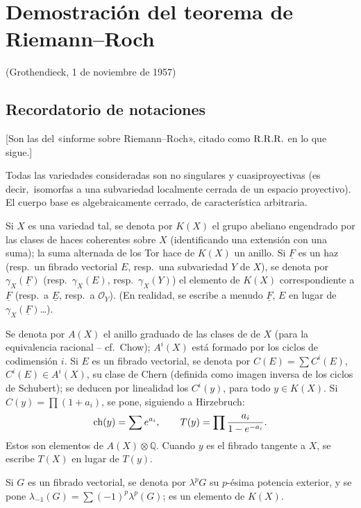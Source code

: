 \section*{Demostración del teorema de Riemann--Roch}
\begin{center}
(Grothendieck, 1 de noviembre de 1957)
\end{center}

\subsection*{Recordatorio de notaciones\footnotemark}
[Son las del «informe sobre Riemann--Roch», citado como \(\mathrm{R.R.R.}\) en lo que sigue.]

Todas las variedades consideradas son no singulares y cuasiproyectivas (es decir,\ isomorfas a una subvariedad localmente cerrada de un espacio proyectivo). El cuerpo base es algebraicamente cerrado, de característica arbitraria.

Si \(X\) es una variedad tal, se denota por \(K(X)\) el grupo abeliano engendrado por las clases de haces coherentes sobre \(X\) (identificando una extensión con una suma); la suma alternada de los Tor hace de \(K(X)\) un anillo. Si \(\underline F\) es un haz (resp.\ un fibrado vectorial \(E\), resp.\ una subvariedad \(Y\) de \(X\)), se denota por \(\gamma_X(\underline F)\) (resp.\ \(\gamma_X(E)\), resp.\ \(\gamma_X(Y)\)) el elemento de \(K(X)\) correspondiente a \(\underline F\) (resp.\ a \(\underline E\), resp.\ a \(\mathcal O_Y\)). (En realidad, se escribe a menudo \(\underline F\), \(E\) en lugar de \(\gamma_X(\underline F)\)\dots).

Se denota por \(A(X)\) el anillo graduado de las clases de  de \(X\) (para la equivalencia racional -- cf.\ Chow); \(A^i(X)\) está formado por los ciclos de codimensión \(i\). Si \(E\) es un fibrado vectorial, se denota por \(C(E)=\sum C^i(E)\), \(C^i(E)\in A^i(X)\), su clase de Chern (definida como imagen inversa de los ciclos de Schubert); se deducen por linealidad los \(C^i(y)\), para todo \(y\in K(X)\). Si \(C(y)=\prod(1+a_i)\), se pone, siguiendo a Hirzebruch:
\[
  \operatorname{ch}(y)=\sum e^{a_i},\qquad
  T(y)=\prod\frac{a_i}{1-e^{-a_i}}.
\]
Estos son elementos de \(A(X)\otimes\mathbb Q\). Cuando \(y\) es el fibrado tangente a \(X\), se escribe \(T(X)\) en lugar de \(T(y)\).

Si \(G\) es un fibrado vectorial, se denota por \(\lambda^pG\) su \(p\)-ésima potencia exterior, y se pone \(\lambda_{-1}(G)=\sum(-1)^p\lambda^p(G)\); es un elemento de \(K(X)\).

